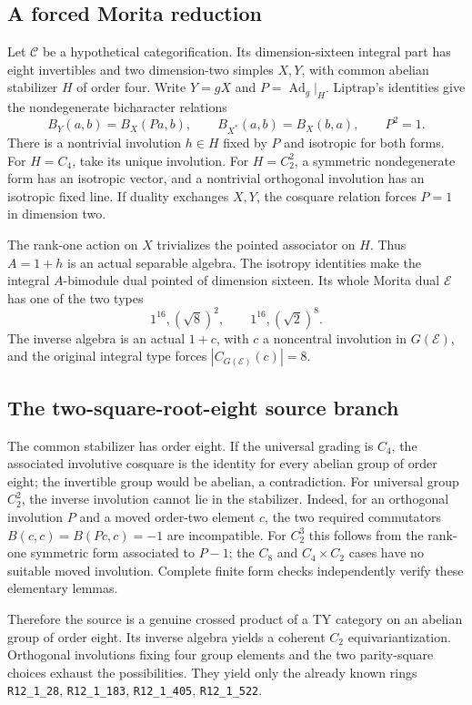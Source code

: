 \documentclass[11pt]{article}
\newcommand{\R}[1]{\texttt{R12\_1\_#1}}
\begin{document}
\subsection{A forced Morita reduction}
Let $\mathcal C$ be a hypothetical categorification. Its dimension-sixteen
integral part has eight invertibles and two dimension-two simples $X,Y$,
with common abelian stabilizer $H$ of order four. Write $Y=gX$ and
$P=\operatorname{Ad}_g|_H$. Liptrap's identities give the nondegenerate
bicharacter relations
\[
 B_Y(a,b)=B_X(Pa,b),\qquad B_{X^*}(a,b)=B_X(b,a),\qquad P^2=1.
\]
There is a nontrivial involution $h\in H$ fixed by $P$ and isotropic for
both forms. For $H=C_4$, take its unique involution. For $H=C_2^2$, a
symmetric nondegenerate form has an isotropic vector, and a nontrivial
orthogonal involution has an isotropic fixed line. If duality exchanges
$X,Y$, the cosquare relation forces $P=1$ in dimension two.

The rank-one action on $X$ trivializes the pointed associator on $H$.
Thus $A=1+h$ is an actual separable algebra. The isotropy identities make
the integral $A$-bimodule dual pointed of dimension sixteen. Its whole
Morita dual $\mathcal E$ has one of the two types
\[
 1^{16},(\sqrt8)^2,\qquad 1^{16},(\sqrt2)^8.
\]
The inverse algebra is an actual $1+c$, with $c$ a noncentral involution
in $G(\mathcal E)$, and the original integral type forces
$|C_{G(\mathcal E)}(c)|=8$.

\subsection{The two-square-root-eight source branch}
The common stabilizer has order eight. If the universal grading is $C_4$,
the associated involutive cosquare is the identity for every abelian group
of order eight; the invertible group would be abelian, a contradiction.
For universal group $C_2^2$, the inverse involution cannot lie in the
stabilizer. Indeed, for an orthogonal involution $P$ and a moved order-two
element $c$, the two required commutators
$B(c,c)=B(Pc,c)=-1$ are incompatible. For $C_2^3$ this follows from the
rank-one symmetric form associated to $P-1$; the $C_8$ and $C_4\times C_2$
cases have no suitable moved involution. Complete finite form checks
independently verify these elementary lemmas.

Therefore the source is a genuine crossed product of a TY category on an
abelian group of order eight. Its inverse algebra yields a coherent
$C_2$ equivariantization. Orthogonal involutions fixing four group elements
and the two parity-square choices exhaust the possibilities. They yield
only the already known rings \R{28}, \R{183}, \R{405}, \R{522}.
\end{document}
